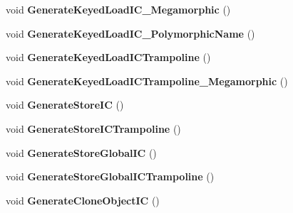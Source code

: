 \begin{DoxyCompactItemize}
\item 
\mbox{\label{classv8_1_1internal_1_1AccessorAssembler_a65c4c9af1e98fb608248c78f20ab6eee}} 
void {\bfseries Generate\+Keyed\+Load\+I\+C\+\_\+\+Megamorphic} ()
\item 
\mbox{\label{classv8_1_1internal_1_1AccessorAssembler_a1fccdac58c30307146808c54e7968258}} 
void {\bfseries Generate\+Keyed\+Load\+I\+C\+\_\+\+Polymorphic\+Name} ()
\item 
\mbox{\label{classv8_1_1internal_1_1AccessorAssembler_ae9dbf9db99c0487e5592b15358499bd3}} 
void {\bfseries Generate\+Keyed\+Load\+I\+C\+Trampoline} ()
\item 
\mbox{\label{classv8_1_1internal_1_1AccessorAssembler_a0733221e4e8a9585f5fd933d86d5094a}} 
void {\bfseries Generate\+Keyed\+Load\+I\+C\+Trampoline\+\_\+\+Megamorphic} ()
\item 
\mbox{\label{classv8_1_1internal_1_1AccessorAssembler_a34dd95f53f34456097f77bdad385dafe}} 
void {\bfseries Generate\+Store\+IC} ()
\item 
\mbox{\label{classv8_1_1internal_1_1AccessorAssembler_ab18160d8870126c01fe14a0b2b08c021}} 
void {\bfseries Generate\+Store\+I\+C\+Trampoline} ()
\item 
\mbox{\label{classv8_1_1internal_1_1AccessorAssembler_a95eab448aed0c8a803399d9b5ffe1979}} 
void {\bfseries Generate\+Store\+Global\+IC} ()
\item 
\mbox{\label{classv8_1_1internal_1_1AccessorAssembler_a9c52911d81ba441ca1c0d10eda114d79}} 
void {\bfseries Generate\+Store\+Global\+I\+C\+Trampoline} ()
\item 
\mbox{\label{classv8_1_1internal_1_1AccessorAssembler_a886d4a0bbe21ac64fac3bcf4372333d7}} 
void {\bfseries Generate\+Clone\+Object\+IC} ()
\item 

\end{DoxyCompactItemize}
